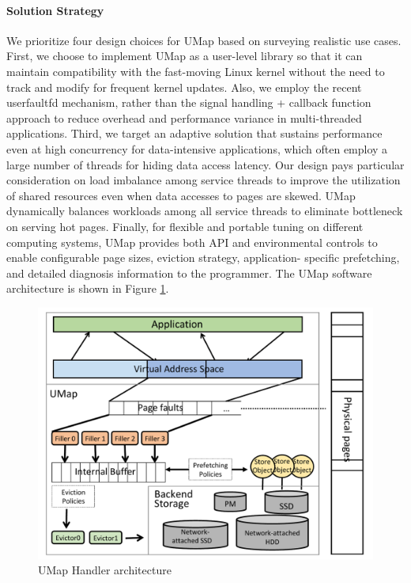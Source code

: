 \paragraph{Solution Strategy}

We prioritize four design choices for UMap based on surveying
realistic use cases. First, we choose to implement UMap as a
user-level library so that it can maintain compatibility with the
fast-moving Linux kernel without the need to track and modify for
frequent kernel updates. Also, we employ the recent userfaultfd 
mechanism, rather than the signal handling + callback function approach
to reduce overhead and performance variance in multi-threaded
applications. Third, we target an adaptive solution that sustains
performance even at high concurrency for data-intensive applications,
which often employ a large number of threads for hiding data access
latency. Our design pays particular consideration on load imbalance
among service threads to improve the utilization of shared resources
even when data accesses to pages are skewed. UMap dynamically balances
workloads among all service threads to eliminate bottleneck on serving
hot pages. Finally, for flexible and portable tuning on different
computing systems, UMap provides both API and environmental controls
to enable configurable page sizes, eviction strategy, application-
specific prefetching, and detailed diagnosis information to the
programmer. The UMap software architecture is shown in Figure
\ref{fig:umaparch}.

\begin{figure}[t]
        \centering
        \includegraphics[scale = 0.5]{projects/2.3.1-PMR/2.3.1.19-Argo-PowerSteering/umap-arch}
        \caption{UMap Handler architecture}
        \label{fig:umaparch}
\end{figure}

